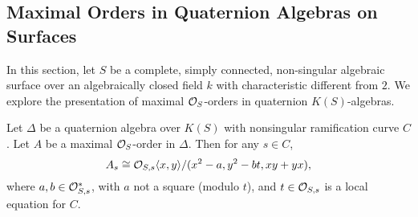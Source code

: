 \subsection{Maximal Orders in Quaternion Algebras on Surfaces}
In this section, let $S$ be a complete, simply connected, non-singular algebraic surface over an algebraically closed field $k$ with characteristic different from $2$.  We explore the presentation of maximal $\mathcal{O}_S$-orders in quaternion $K(S)$-algebras.
\begin{prop}
Let $\Delta$ be a quaternion algebra over $K(S)$ with nonsingular ramification curve $C$.  Let $A$ be a maximal $\mathcal{O}_S$-order in $\Delta$.  Then for any $s\in C$,
$$A_s \cong \mathcal{O}_{S,s}\langle x,y\rangle/(x^2-a,y^2-bt,xy+yx),$$
where $a,b\in\mathcal{O}_{S,s}^*$, with $a$ not a square (modulo $t$), and $t\in \mathcal{O}_{S,s}$ is a local equation for $C$.
\end{prop}
